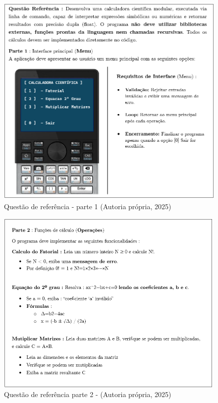 \begin{figure}[ht]
	\centering
	\includegraphics[width=12cm]{./imagens/capitulo4/questao-referencia-1.png}
	\caption{Questão de referência - parte 1 (Autoria própria, 2025)}
	\label{fig:questao-referencia-part-1}
\end{figure}


\begin{figure}[ht]
    \centering
    \includegraphics[width=12cm]{./imagens/capitulo4/questao-referencia-2.png}
    \caption{Questão de referência parte 2 - (Autoria própria, 2025)}
    \label{fig:questao-referencia-part-2}
\end{figure}

